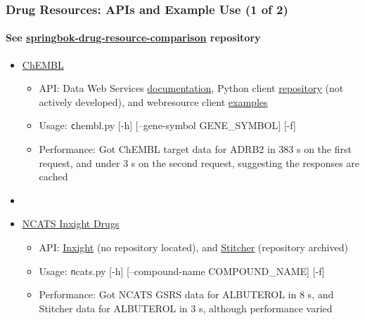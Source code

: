 \documentclass[aspectratio=169,xcolor=dvipsnames]{beamer}
\begin{document}
\begin{frame}
  \frametitle{Drug Resources: APIs and Example Use (1 of 2)}
  \framesubtitle{See
    \href{https://github.com/ralatsdc/springbok-drug-resource-comparison}{springbok-drug-resource-comparison}
    repository}
  \begin{itemize}
  \item[] \href{https://www.ebi.ac.uk/chembl/}{ChEMBL}
    \begin{itemize}
    \item API: Data Web Services
      \href{https://chembl.gitbook.io/chembl-interface-documentation/web-services/chembl-data-web-services}{documentation},
      Python client
      \href{https://github.com/chembl/chembl_webresource_client}{repository}
      (not actively developed), and webresource client
      \href{http://beta.mybinder.org/v2/gh/chembl/chembl_webresource_client/master?filepath=demo_wrc.ipynb}{examples}
    \item Usage: {\texttt chembl.py [-h] [--gene-symbol GENE\_SYMBOL]
      [-f]}
    \item Performance: Got ChEMBL target data for ADRB2 in 383 s on
      the first request, and under 3 s on the second request,
      suggesting the responses are cached
    \end{itemize}
  \item[]
  \item[] \href{https://drugs.ncats.io/}{NCATS Inxight Drugs}
    \begin{itemize}
    \item API: \href{https://drugs.ncats.io/api}{Inxight} (no
      repository located), and
      \href{https://github.com/ncats/stitcher}{Stitcher} (repository
      archived)
    \item Usage: {\texttt ncats.py [-h] [--compound-name COMPOUND\_NAME] [-f]}
    \item Performance: Got NCATS GSRS data for ALBUTEROL in 8 s, and
      Stitcher data for ALBUTEROL in 3 s, although performance varied
    \end{itemize}
  \end{itemize}
\end{frame}
\end{document}

